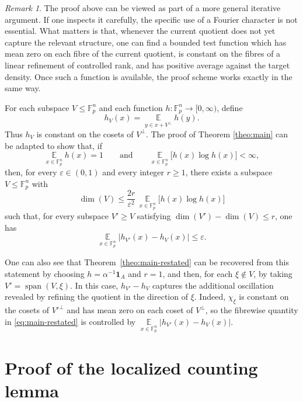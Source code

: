 \documentclass[11pt,reqno]{amsart}
\theoremstyle{plain}
\theoremstyle{remark}
\newtheorem{rem}[thm]{Remark}
\begin{document}
\begin{rem}
The proof above can be viewed as part of a more general iterative argument.
If one inspects it carefully, the specific use of a Fourier character is not
essential. What matters is that, whenever the current quotient does not yet
capture the relevant structure, one can find a bounded test function which has
mean zero on each fibre of the current quotient, is constant on the fibres of a
linear refinement of controlled rank, and has positive average against the
target density. Once such a function is available, the proof scheme works exactly in the same way.

For each subspace $V\le \mathbb F_p^n$ and each function
$h:\mathbb F_p^n\to[0,\infty)$, define
$$
h_V(x)=\mathop{\mathbb E}\limits_{y\in x+V^\perp} h(y).
$$
Thus $h_V$ is constant on the cosets of $V^\perp$. The proof of Theorem \ref{theo:main} can be adapted to
show that, if
$$
\mathop{\mathbb E}\limits_{x\in\mathbb F_p^n} h(x)=1
\qquad\text{and}\qquad
\mathop{\mathbb E}\limits_{x\in\mathbb F_p^n}\bigl[h(x)\log h(x)\bigr]<\infty,
$$
then, for every $\varepsilon\in(0,1)$ and every integer $r\ge 1$, there exists
a subspace $V\le \mathbb F_p^n$ with
$$
\dim(V)\le \frac{2r}{\varepsilon^2}\,
\mathop{\mathbb E}\limits_{x\in\mathbb F_p^n}\bigl[h(x)\log h(x)\bigr]
$$
such that, for every subspace $V'\ge V$ satisfying
$\dim(V')-\dim(V)\le r$, one has
$$
\mathop{\mathbb E}\limits_{x\in\mathbb F_p^n}|h_{V'}(x)-h_V(x)|\le \varepsilon.
$$

One can also see that Theorem~\ref{theo:main-restated} can be recovered from
this statement by choosing $h=\alpha^{-1}\mathbf 1_A$ and $r=1$, and then, for
each $\xi\notin V$, by taking $V'=\operatorname{span}(V,\xi)$. In this case,
$h_{V'}-h_V$ captures the additional oscillation revealed by refining the
quotient in the direction of $\xi$. Indeed, $\chi_\xi$ is constant on the
cosets of $V'^\perp$ and has mean zero on each coset of $V^\perp$, so the
fibrewise quantity in \eqref{eq:main-restated} is controlled by
$\mathop{\mathbb E}\limits_{x\in\mathbb F_p^n}|h_{V'}(x)-h_V(x)|$.
\end{rem}
\section{Proof of the localized counting lemma}
\end{document}
